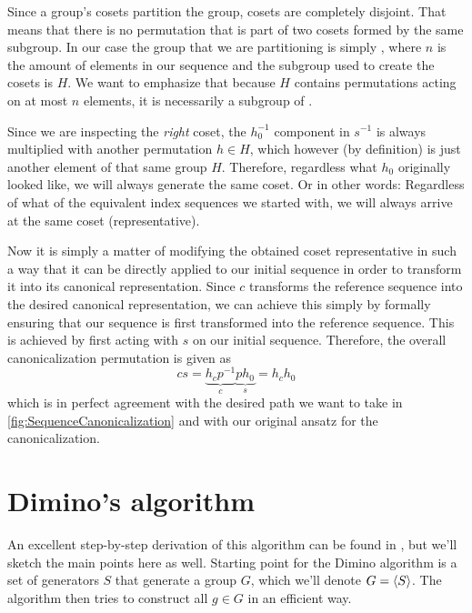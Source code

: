 \documentclass[parskip=half]{scrartcl}
\begin{document}
	Since a group's cosets partition the group, cosets are completely disjoint. That means that there is no permutation that is part of two cosets
	formed by the same subgroup. In our case the group that we are partitioning is simply , where $n$ is the amount of elements in our sequence
	and the subgroup used to create the cosets is $H$. We want to emphasize that because $H$ contains permutations acting on at most $n$ elements, it
	is necessarily a subgroup of .

	Since we are inspecting the \emph{right} coset, the $h_0^{-1}$ component in $s^{-1}$ is always multiplied with another permutation $h \in H$,
	which however (by definition) is just another element of that same group $H$. Therefore, regardless what $h_0$ originally looked like, we will
	always generate the same coset. Or in other words: Regardless of what of the equivalent index sequences we started with, we will always arrive at
	the same coset (representative).

	Now it is simply a matter of modifying the obtained coset representative in such a way that it can be directly applied to our initial sequence in
	order to transform it into its canonical representation. Since $c$ transforms the reference sequence into the desired canonical representation, we
	can achieve this simply by formally ensuring that our sequence is first transformed into the reference sequence. This is achieved by first acting
	with $s$ on our initial sequence. Therefore, the overall canonicalization permutation is given as
	\begin{equation}
		c s = \underbrace{h_c p^{-1}}_{c} \underbrace{p h_0}_{s} = h_c h_0
	\end{equation}
	which is in perfect agreement with the desired path we want to take in \cref{fig:SequenceCanonicalization} and with our original ansatz for the
	canonicalization.


	\appendix

	\section{Dimino's algorithm}
	\label{sec:DiminoAlgorithm}

	An excellent step-by-step derivation of this algorithm can be found in \textcite{Butler1991a}, but we'll sketch the main points here as well.
	Starting point for the Dimino algorithm is a set of generators $S$ that generate a group $G$, which we'll denote $G = \braket{S}$. The algorithm
	then tries to construct all $g \in G$ in an efficient way.
\end{document}
